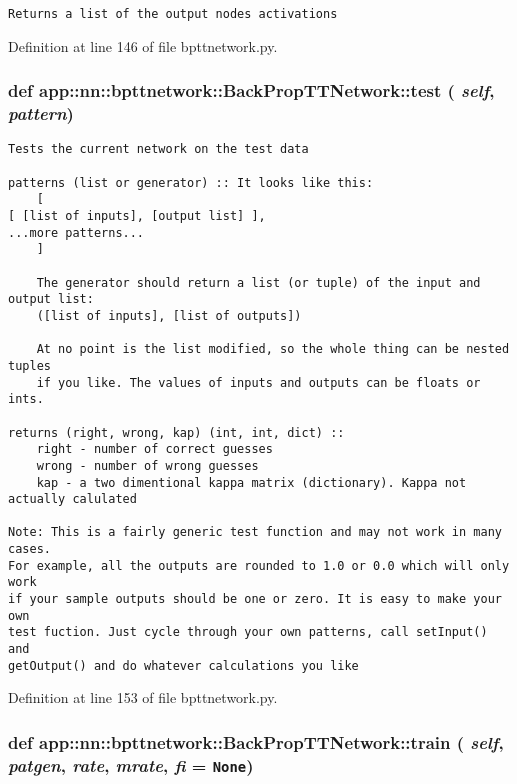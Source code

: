 \footnotesize\begin{verbatim}Returns a list of the output nodes activations\end{verbatim}
\normalsize
 

Definition at line 146 of file bpttnetwork.py.
\subsubsection{\setlength{\rightskip}{0pt plus 5cm}def app::nn::bpttnetwork::BackPropTTNetwork::test ( {\em self},  {\em pattern})}\label{classapp_1_1nn_1_1bpttnetwork_1_1BackPropTTNetwork_b24b762f035e90cdda7b2f1539ee81e1}




\footnotesize\begin{verbatim}Tests the current network on the test data

patterns (list or generator) :: It looks like this:
    [ 
[ [list of inputs], [output list] ],
...more patterns...
    ]
    
    The generator should return a list (or tuple) of the input and output list:
    ([list of inputs], [list of outputs])

    At no point is the list modified, so the whole thing can be nested tuples
    if you like. The values of inputs and outputs can be floats or ints.

returns (right, wrong, kap) (int, int, dict) ::
    right - number of correct guesses
    wrong - number of wrong guesses
    kap - a two dimentional kappa matrix (dictionary). Kappa not actually calulated

Note: This is a fairly generic test function and may not work in many cases.
For example, all the outputs are rounded to 1.0 or 0.0 which will only work
if your sample outputs should be one or zero. It is easy to make your own
test fuction. Just cycle through your own patterns, call setInput() and 
getOutput() and do whatever calculations you like
\end{verbatim}
\normalsize
 

Definition at line 153 of file bpttnetwork.py.
\subsubsection{\setlength{\rightskip}{0pt plus 5cm}def app::nn::bpttnetwork::BackPropTTNetwork::train ( {\em self},  {\em patgen},  {\em rate},  {\em mrate},  {\em fi} = {\tt None})}\label{classapp_1_1nn_1_1bpttnetwork_1_1BackPropTTNetwork_7b6bd4b377398567063bfc96436f7bc3}




